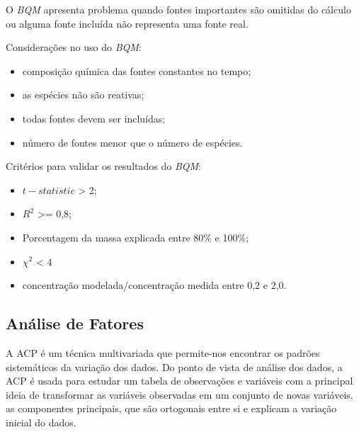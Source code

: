 
O \textit{BQM} apresenta problema quando fontes importantes são omitidas do
cálculo ou alguma fonte incluída não representa uma fonte real.

Considerações no uso do \textit{BQM}: 
\begin{itemize}
  \item composição química das fontes constantes no tempo;
  \item as espécies não são reativas;
  \item todas fontes devem ser incluídas;
  \item número de fontes menor que o número de espécies.
\end{itemize}


Critérios para validar os resultados do \textit{BQM}:

\begin{itemize}
  \item $t-statistic$ > 2;
  \item $R^2$ >= 0,8;
  \item Porcentagem da massa explicada entre 80\% e 100\%; 
  \item ${\chi}^2$ < 4
  \item concentração modelada/concentração medida entre 0,2 e 2,0.
\end{itemize}

\subsection{Análise de Fatores}

A ACP é um técnica multivariada que permite-nos encontrar os padrões 
sistemáticos da variação dos dados. 
Do ponto de vista de análise dos dados, a ACP é usada para estudar um 
tabela de observações e variáveis com a principal ideia de transformar 
as variáveis observadas em um conjunto de novas variáveis, 
as componentes principais, que são ortogonais entre si 
e explicam a variação inicial do dados.

